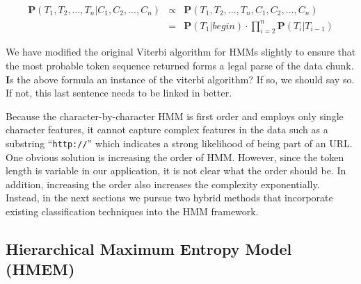 \begin{eqnarray}
\mathbf{P}(T_1, T_2, ..., T_n|C_1, C_2, ..., C_n) & \propto & \mathbf{P}(T_1, T_2, ..., T_n, C_1, C_2, ..., C_n) \nonumber \\
& = & \mathbf{P}(T_1|begin) \cdot
\prod_{i=2}^{n}{\mathbf{P}(T_i|T_{i-1})}
\end{eqnarray}

We have modified the original Viterbi algorithm for HMMs slightly
to ensure that the most probable token sequence returned forms a legal
parse of the data chunk. {\textbf Is the above formula an instance of
  the viterbi algorithm?  If so, we should say so. If not, this last
  sentence needs to be linked in better.}

Because the character-by-character HMM is first order and employs only 
single character features, it cannot capture complex features
in the data such as  
a substring ``{\tt http://}'' which indicates a strong likelihood 
of being part of an URL.
One obvious solution is increasing the order of HMM.  However, since
the token length is variable in our application, it is not clear what
the order should be.  In addition, increasing the order also increases
the complexity exponentially.  Instead, in the next sections we pursue
two hybrid methods that incorporate existing classification techniques
into the HMM framework.

\subsection{Hierarchical Maximum Entropy Model (HMEM)}\label{subsec:hmem}

